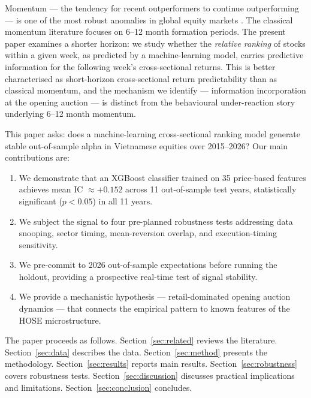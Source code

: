 \documentclass[12pt,a4paper]{article}
\begin{document}
Momentum --- the tendency for recent outperformers to continue outperforming ---
is one of the most robust anomalies in global equity markets
\citep{jegadeesh1993returns,rouwenhorst1998international,asness2014value}.
The classical momentum literature focuses on 6--12 month formation periods.
The present paper examines a shorter horizon: we study whether the \emph{relative
ranking} of stocks within a given week, as predicted by a machine-learning model,
carries predictive information for the following week's cross-sectional returns.
This is better characterised as short-horizon cross-sectional return predictability
than as classical momentum, and the mechanism we identify --- information
incorporation at the opening auction --- is distinct from the behavioural
under-reaction story underlying 6--12 month momentum.

This paper asks: does a machine-learning cross-sectional ranking model generate
stable out-of-sample alpha in Vietnamese equities over 2015--2026?
Our main contributions are:

\begin{enumerate}
  \item We demonstrate that an XGBoost classifier trained on 35 price-based features
        achieves mean IC $\approx +0.152$ across 11 out-of-sample test years,
        statistically significant ($p < 0.05$) in all 11 years.
  \item We subject the signal to four pre-planned robustness tests addressing data
        snooping, sector timing, mean-reversion overlap, and execution-timing
        sensitivity.
  \item We pre-commit to 2026 out-of-sample expectations before running the holdout,
        providing a prospective real-time test of signal stability.
  \item We provide a mechanistic hypothesis --- retail-dominated opening auction
        dynamics --- that connects the empirical pattern to known features of the
        HOSE microstructure.
\end{enumerate}

The paper proceeds as follows. Section~\ref{sec:related} reviews the literature.
Section~\ref{sec:data} describes the data. Section~\ref{sec:method} presents the
methodology. Section~\ref{sec:results} reports main results.
Section~\ref{sec:robustness} covers robustness tests.
Section~\ref{sec:discussion} discusses practical implications and limitations.
Section~\ref{sec:conclusion} concludes.

\end{document}
